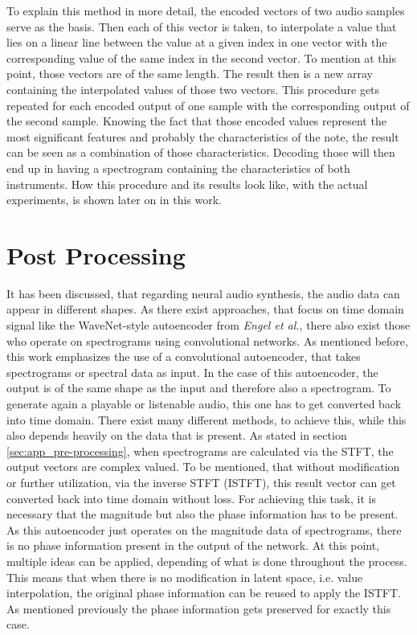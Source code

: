 To explain this method in more detail, the encoded vectors of two audio samples serve as the basis. Then each of this vector is taken, to interpolate a value that lies on a linear line between the value at a given index in one vector with the corresponding value of the same index in the second vector. To mention at this point, those vectors are of the same length. The result then is a new array containing the interpolated values of those two vectors. This procedure gets repeated for each encoded output of one sample with the corresponding output of the second sample. Knowing the fact that those encoded values represent the most significant features and probably the characteristics of the note, the result can be seen as a combination of those characteristics. Decoding those will then end up in having a spectrogram containing the characteristics of both instruments. How this procedure and its results look like, with the actual experiments, is shown later on in this work. 

\section{Post Processing}
\label{sec:app_post_processing}
It has been discussed, that regarding neural audio synthesis, the audio data can appear in different shapes. As there exist approaches, that focus on time domain signal like the WaveNet-style autoencoder from \textit{Engel et al.}, there also exist those who operate on spectrograms using convolutional networks. As mentioned before, this work emphasizes the use of a convolutional autoencoder, that takes spectrograms or spectral data as input. In the case of this autoencoder, the output is of the same shape as the input and therefore also a spectrogram. To generate again a playable or listenable audio, this one has to get converted back into time domain. There exist many different methods, to achieve this, while this also depends heavily on the data that is present. As stated in section \ref{sec:app_pre-processing}, when spectrograms are calculated via the STFT, the output vectors are complex valued. To be mentioned, that without modification or further utilization, via the inverse STFT (ISTFT), this result vector can get converted back into time domain without loss. For achieving this task, it is necessary that the magnitude but also the phase information has to be present. As this autoencoder just operates on the magnitude data of spectrograms, there is no phase information present in the output of the network. At this point, multiple ideas can be applied, depending of what is done throughout the process. This means that when there is no modification in latent space, i.e. value interpolation, the original phase information can be reused to apply the ISTFT. As mentioned previously the phase information gets preserved for exactly this case. 


